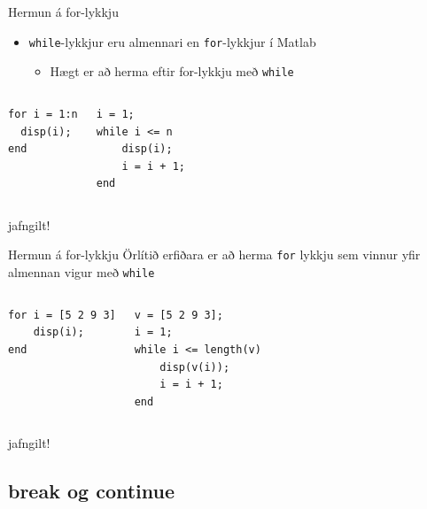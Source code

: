 \documentclass{beamer}
\begin{document}
\begin{frame}[fragile]{Hermun á for-lykkju}
\vspace{\baselineskip}
\begin{itemize}
 \item \texttt{while}-lykkjur eru almennari en \texttt{for}-lykkjur í Matlab
 \begin{itemize}
  \item Hægt er að herma eftir for-lykkju með \texttt{while}
 \end{itemize}
\end{itemize}
\begin{columns}
\begin{verbatim}
for i = 1:n
  disp(i);
end
\end{verbatim}
\begin{verbatim}
i = 1;
while i <= n
    disp(i);
    i = i + 1;
end
\end{verbatim}
\end{columns}
\begin{center}
jafngilt!
\end{center}
\end{frame}

\begin{frame}[fragile]{Hermun á for-lykkju}
\vspace{\baselineskip}
Örlítið erfiðara er að herma \texttt{for} lykkju sem vinnur yfir almennan vigur með \texttt{while}
\begin{columns}
\begin{verbatim}
for i = [5 2 9 3]
    disp(i);
end
\end{verbatim}
\begin{verbatim}
v = [5 2 9 3];
i = 1;
while i <= length(v)
    disp(v(i));
    i = i + 1;
end
\end{verbatim}
\end{columns}
\begin{center}
jafngilt!
\end{center}
\end{frame}

\subsection{break og continue}
\end{document}
